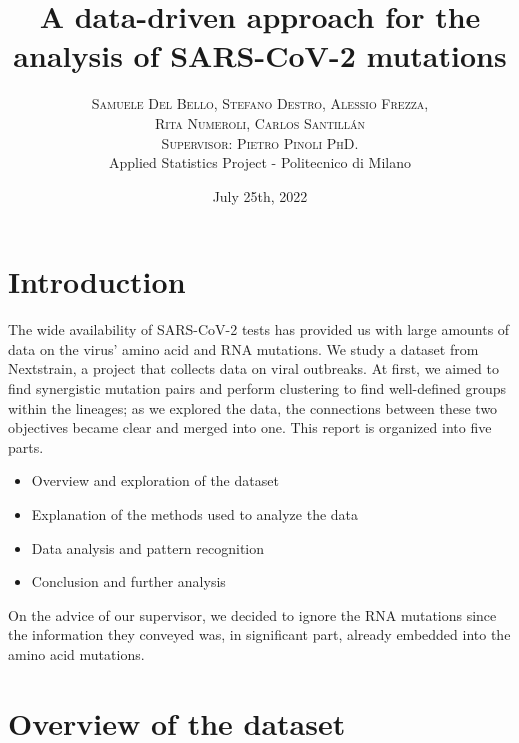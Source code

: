 \documentclass[twoside,twocolumn]{article}
\title{A data-driven approach for the analysis of SARS-CoV-2 mutations} %
\author{%
	\textsc{Samuele Del Bello, Stefano Destro, Alessio Frezza,}\\
	\textsc{Rita Numeroli, Carlos Santillán} \\[1ex] %
	\textsc{Supervisor: Pietro Pinoli PhD.}\\
	\normalsize  Applied Statistics Project - Politecnico di Milano \\
}
\date{July 25th, 2022}
\begin{document}
	\maketitle
	
	\section{Introduction}
	
	The wide availability of SARS-CoV-2 tests has provided us with large amounts of data on the virus' amino acid and RNA mutations. We study a dataset from Nextstrain\cite{nextstrainbook}, a project that collects data on viral outbreaks. At first, we aimed to find synergistic mutation pairs and perform clustering to find well-defined groups within the lineages; as we explored the data, the connections between these two objectives became clear and merged into one. This report is organized into five parts.
	\begin{itemize}
		\item Overview and exploration of the dataset 
		\item Explanation of the methods used to analyze the data
		\item Data analysis and pattern recognition
		\item Conclusion and further analysis
	\end{itemize}
	On the advice of our supervisor, we decided to ignore the RNA mutations since the information they conveyed was, in significant part, already embedded into the amino acid mutations.
	
	\section{Overview of the dataset}
	
\end{document}
